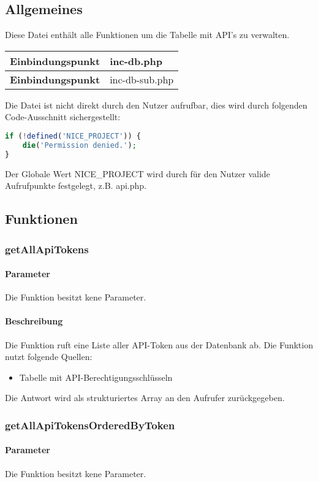 \subsection{Allgemeines} Diese Datei enthält alle Funktionen um die Tabelle mit API's zu verwalten.
\begin{table}[H]
	\begin{tabular}{|c|p{11cm}|}
		\hline
		\textbf{Einbindungspunkt} & inc-db.php \\ \hline
		\textbf{Einbindungspunkt} & inc-db-sub.php \\ \hline
	\end{tabular}
\end{table}
Die Datei ist nicht direkt durch den Nutzer aufrufbar, dies wird durch folgenden Code-Ausschnitt sichergestellt:
\begin{lstlisting}[language=php]
if (!defined('NICE_PROJECT')) {
	die('Permission denied.');
}
\end{lstlisting}
Der Globale Wert {\glqq NICE\_PROJECT\grqq} wird durch für den Nutzer valide Aufrufpunkte festgelegt, z.B. {\glqq api.php\grqq}.
\newpage
\subsection{Funktionen}
\subsubsection{getAllApiTokens}
\paragraph{Parameter} Die Funktion besitzt kene Parameter.
\paragraph{Beschreibung} Die Funktion ruft eine Liste aller API-Token aus der Datenbank ab. Die Funktion nutzt folgende Quellen:
\begin{itemize}
	\item Tabelle mit API-Berechtigungsschlüsseln
\end{itemize}
Die Antwort wird als strukturiertes Array an den Aufrufer zurückgegeben.
\subsubsection{getAllApiTokensOrderedByToken}
\paragraph{Parameter} Die Funktion besitzt kene Parameter.
